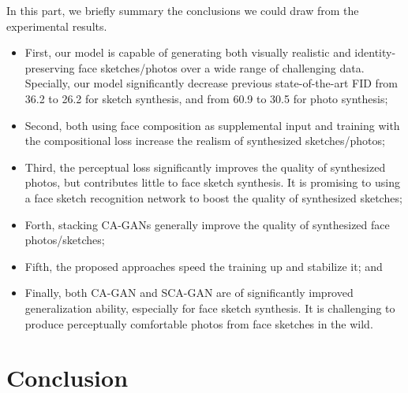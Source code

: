 \documentclass[journal]{IEEEtran}
\begin{document}
In this part, we briefly summary the conclusions we could draw from the experimental results.  
\begin{itemize}
\item First, our model is capable of generating both visually realistic and identity-preserving face sketches/photos over a wide range of challenging data. Specially, our model significantly decrease previous state-of-the-art FID from 36.2 to 26.2 for sketch synthesis, and from 60.9 to 30.5 for photo synthesis; 

\item Second, both using face composition as supplemental input and training with the compositional loss increase the realism of synthesized sketches/photos;

\item Third, the perceptual loss significantly improves the quality of synthesized photos, but contributes little to face sketch synthesis. It is promising to using a face sketch recognition network to boost the quality of synthesized sketches;

\item Forth, stacking CA-GANs generally improve the quality of synthesized face photos/sketches;

\item Fifth, the proposed approaches speed the training up and stabilize it; and

\item Finally, both CA-GAN and SCA-GAN are of significantly improved generalization ability, especially for face sketch synthesis. It is challenging to produce perceptually comfortable photos from face sketches in the wild. 

\end{itemize}



\section{Conclusion}
\label{sec:conclusion}
\end{document}
